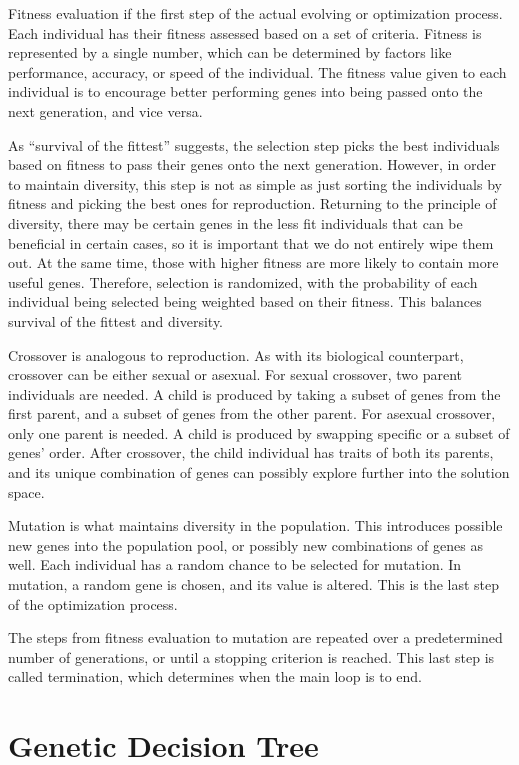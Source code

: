 \documentclass[12pt]{article}
\begin{document}
Fitness evaluation if the first step of the actual evolving or optimization process. Each individual has their fitness assessed based on a set of criteria. Fitness is represented by a single number, which can be determined by factors like performance, accuracy, or speed of the individual. The fitness value given to each individual is to encourage better performing genes into being passed onto the next generation, and vice versa.

As ``survival of the fittest'' suggests, the selection step picks the best individuals based on fitness to pass their genes onto the next generation. However, in order to maintain diversity, this step is not as simple as just sorting the individuals by fitness and picking the best ones for reproduction. Returning to the principle of diversity, there may be certain genes in the less fit individuals that can be beneficial in certain cases, so it is important that we do not entirely wipe them out. At the same time, those with higher fitness are more likely to contain more useful genes. Therefore, selection is randomized, with the probability of each individual being selected being weighted based on their fitness. This balances survival of the fittest and diversity.

Crossover is analogous to reproduction. As with its biological counterpart, crossover can be either sexual or asexual. For sexual crossover, two parent individuals are needed. A child is produced by taking a subset of genes from the first parent, and a subset of genes from the other parent. For asexual crossover, only one parent is needed. A child is produced by swapping specific or a subset of genes' order. After crossover, the child individual has traits of both its parents, and its unique combination of genes can possibly explore further into the solution space.

Mutation is what maintains diversity in the population. This introduces possible new genes into the population pool, or possibly new combinations of genes as well. Each individual has a random chance to be selected for mutation. In mutation, a random gene is chosen, and its value is altered. This is the last step of the optimization process.

The steps from fitness evaluation to mutation are repeated over a predetermined number of generations, or until a stopping criterion is reached. This last step is called termination, which determines when the main loop is to end.

\section{Genetic Decision Tree}
\end{document}
